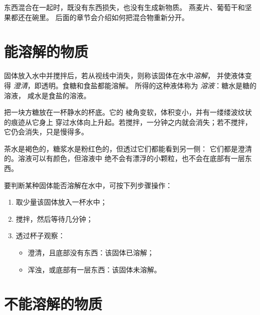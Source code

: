\begin{remark}[混合不会使物质消失]\label{rem:g2:mixing-and-dissolving:nothing-lost}
东西混合在一起时，既没有东西损失，也没有生成新物质。
燕麦片、葡萄干和坚果都还在碗里。
后面的章节会介绍如何把混合物重新分开。
\end{remark}

\section{能溶解的物质}

\begin{definition}[溶解与溶液]\label{def:g2:mixing-and-dissolving:dissolve}
固体放入水中并搅拌后，若从视线中消失，则称该固体在水中\emph{溶解}，
并使液体变得
\emph{澄清}，即透明。食糖和食盐都能溶解。
所得的这种液体称为
\emph{溶液}：糖水是糖的溶液，
咸水是食盐的溶液。
\end{definition}

\begin{example}[一杯水中的方糖]\label{ex:g2:mixing-and-dissolving:cube}
把一块方糖放在一杯静水的杯底。它的
棱角变软，体积变小，并有一缕缕波纹状的痕迹从它身上
穿过水体向上升起。若搅拌，一分钟之内就会消失；若不搅拌，
它仍会消失，只是慢得多。
\end{example}

\begin{remark}[澄清不等于无色]\label{rem:g2:mixing-and-dissolving:clear}
茶水是褐色的，糖浆水是粉红色的，但透过它们都能看到另一侧：
它们都是澄清的。溶液可以有颜色，但溶液中
绝不会有漂浮的小颗粒，也不会在底部有一层东西。
\end{remark}

\begin{method}[它能溶解吗？]\label{met:g2:mixing-and-dissolving:test}
要判断某种固体能否溶解在水中，可按下列步骤操作：
\begin{enumerate}
  \item 取少量该固体放入一杯水中；
  \item 搅拌，然后等待几分钟；
  \item 透过杯子观察：
    \begin{itemize}
      \item 澄清，且底部没有东西：该固体已溶解；
      \item 浑浊，或底部有一层东西：该固体未溶解。
    \end{itemize}
\end{enumerate}
\end{method}

\section{不能溶解的物质}

